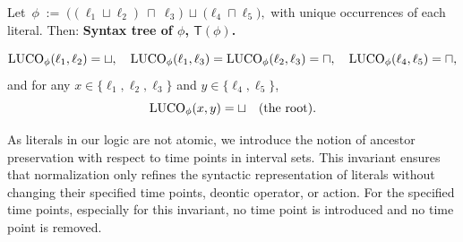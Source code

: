 \begin{example}\label{ex:AST}
Let~$
\phi \;:=\; \Big((\ell_1 \sqcup \ell_2)\ \sqcap\ \ell_3\Big)\ \sqcup\ \Big(\ell_4 \sqcap \ell_5\Big),$
with unique occurrences of each literal. Then:
\medskip
\noindent\textbf{Syntax tree of $\phi$, $\mathsf{T}(\phi)$.}
\begin{center}
\end{center}

\[
\mathrm{LUCO}_\phi(\ell_1,\ell_2)=\sqcup,\quad
\mathrm{LUCO}_\phi(\ell_1,\ell_3)=\mathrm{LUCO}_\phi(\ell_2,\ell_3)=\sqcap,\quad
\mathrm{LUCO}_\phi(\ell_4,\ell_5)=\sqcap,
\]
and for any $x\in\{\ell_1,\ell_2,\ell_3\}$ and $y\in\{\ell_4,\ell_5\}$,
\[
\mathrm{LUCO}_\phi(x,y)=\sqcup \quad\text{(the root).}
\]
\end{example}


As literals in our logic are not atomic, we introduce the notion of ancestor preservation with respect to time points in interval sets.
This invariant ensures that normalization only refines the syntactic representation of literals without changing their specified time points, deontic operator, or action. For the specified time points, especially for this invariant, no time point is introduced and no time point is removed.


